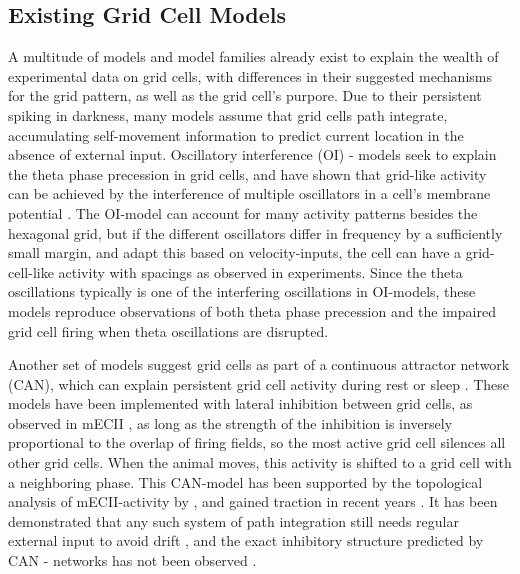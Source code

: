 \documentclass{article}
\begin{document}
    \subsection{Existing Grid Cell Models} \label{Grid Models}
    A multitude of models and model families already exist to explain the wealth of experimental data on grid cells, with differences in their suggested mechanisms for the grid pattern, as well as the grid cell's purpore. Due to their persistent spiking in darkness, many models assume that grid cells path integrate, accumulating self-movement information to predict current location in the absence of external input. Oscillatory interference (OI) - models seek to explain the theta phase precession in grid cells, and have shown that grid-like activity can be achieved by the interference of multiple oscillators in a cell's membrane potential \parencite{Burgess2007,Zilli2010}. The OI-model can account for many activity patterns besides the hexagonal grid, but if the different oscillators differ in frequency by a sufficiently small margin, and adapt this based on velocity-inputs, the cell can have a grid-cell-like activity with spacings as observed in experiments. Since the theta oscillations typically is one of the interfering oscillations in OI-models, these models reproduce observations of both theta phase precession and the impaired grid cell firing when theta oscillations are disrupted.

    Another set of models suggest grid cells as part of a continuous attractor network (CAN), which can explain persistent grid cell activity during rest or sleep \parencite{Yoon2013,Widloski2014}. These models have been implemented with lateral inhibition between grid cells, as observed in mECII \parencite{Couey2013}, as long as the strength of the inhibition is inversely proportional to the overlap of firing fields, so the most active grid cell silences all other grid cells. When the animal moves, this activity is shifted to a grid cell with a neighboring phase. This CAN-model has been supported by the topological analysis of mECII-activity by \cite{Gardner2022}, and gained traction in recent years \parencite{Sorscher2023}. It has been demonstrated that any such system of path integration still needs regular external input to avoid drift \parencite{Cheung2007, Mulas2016}, and the exact inhibitory structure predicted by CAN - networks has not been observed \parencite{Zilli2012}. 
\end{document}
